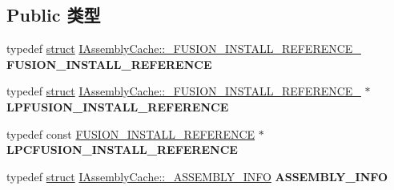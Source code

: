 \subsection*{Public 类型}
\begin{DoxyCompactItemize}
\item 
\mbox{\label{interface_i_assembly_cache_a883f78c6a995af71da5c692c9bb8b8ae}} 
typedef \hyperlink{interfacestruct}{struct} \hyperlink{struct_i_assembly_cache_1_1___f_u_s_i_o_n___i_n_s_t_a_l_l___r_e_f_e_r_e_n_c_e__}{I\+Assembly\+Cache\+::\+\_\+\+F\+U\+S\+I\+O\+N\+\_\+\+I\+N\+S\+T\+A\+L\+L\+\_\+\+R\+E\+F\+E\+R\+E\+N\+C\+E\+\_\+} {\bfseries F\+U\+S\+I\+O\+N\+\_\+\+I\+N\+S\+T\+A\+L\+L\+\_\+\+R\+E\+F\+E\+R\+E\+N\+CE}
\item 
\mbox{\label{interface_i_assembly_cache_a7d248ca4f1dd7de1ff90ef5a5333681a}} 
typedef \hyperlink{interfacestruct}{struct} \hyperlink{struct_i_assembly_cache_1_1___f_u_s_i_o_n___i_n_s_t_a_l_l___r_e_f_e_r_e_n_c_e__}{I\+Assembly\+Cache\+::\+\_\+\+F\+U\+S\+I\+O\+N\+\_\+\+I\+N\+S\+T\+A\+L\+L\+\_\+\+R\+E\+F\+E\+R\+E\+N\+C\+E\+\_\+} $\ast$ {\bfseries L\+P\+F\+U\+S\+I\+O\+N\+\_\+\+I\+N\+S\+T\+A\+L\+L\+\_\+\+R\+E\+F\+E\+R\+E\+N\+CE}
\item 
\mbox{\label{interface_i_assembly_cache_ae412cda8db6422a0d7a389558b9a9064}} 
typedef const \hyperlink{struct_i_assembly_cache_1_1___f_u_s_i_o_n___i_n_s_t_a_l_l___r_e_f_e_r_e_n_c_e__}{F\+U\+S\+I\+O\+N\+\_\+\+I\+N\+S\+T\+A\+L\+L\+\_\+\+R\+E\+F\+E\+R\+E\+N\+CE} $\ast$ {\bfseries L\+P\+C\+F\+U\+S\+I\+O\+N\+\_\+\+I\+N\+S\+T\+A\+L\+L\+\_\+\+R\+E\+F\+E\+R\+E\+N\+CE}
\item 
\mbox{\label{interface_i_assembly_cache_a280f1fa93b042469a1925944e5104904}} 
typedef \hyperlink{interfacestruct}{struct} \hyperlink{struct_i_assembly_cache_1_1___a_s_s_e_m_b_l_y___i_n_f_o}{I\+Assembly\+Cache\+::\+\_\+\+A\+S\+S\+E\+M\+B\+L\+Y\+\_\+\+I\+N\+FO} {\bfseries A\+S\+S\+E\+M\+B\+L\+Y\+\_\+\+I\+N\+FO}
\end{DoxyCompactItemize}
